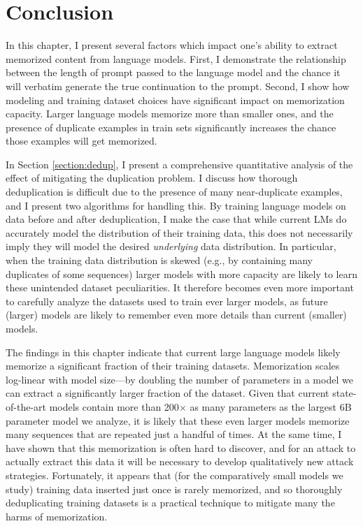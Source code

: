 \section{Conclusion}

%
In this chapter, I present several factors which impact one's ability to extract memorized content from language models.
First, I demonstrate the relationship between the length of prompt passed to the language model and the chance it will verbatim generate the true continuation to the prompt.
Second, I show how modeling and training dataset choices have significant impact on memorization capacity.
Larger language models memorize more than smaller ones, and the presence of duplicate examples in train sets significantly increases the chance those examples will get memorized.

In Section \ref{section:dedup}, I present a comprehensive quantitative analysis of the effect of mitigating the duplication problem.
I discuss how thorough deduplication is difficult due to the presence of many near-duplicate examples, and I present two algorithms for handling this.
By training language models on data before and after deduplication, I make the case that while current LMs do accurately model the distribution of their training data, this does not necessarily imply they will model the desired \emph{underlying} data distribution.
In particular, when the training data distribution is skewed (e.g., by containing many duplicates of some sequences) larger models with more capacity are likely to learn these unintended dataset peculiarities.
%
It therefore becomes even more important to carefully analyze the datasets used to train ever larger models, as future (larger) models are likely to remember even more details than current (smaller) models.


The findings in this chapter indicate that current large language models likely memorize a significant fraction of their training datasets.
%
Memorization scales log-linear with model size---by doubling the number of parameters in a model we can extract a significantly larger fraction of the dataset.
%
Given that current state-of-the-art models contain more than 200$\times$ as many parameters as the largest 6B parameter model we analyze, it is likely that these even larger models memorize many sequences that are repeated just a handful of times.
%
At the same time, I have shown that this memorization is often hard to discover, and for an attack to actually extract this data it will be necessary to develop qualitatively new attack strategies.
%
Fortunately, it appears that (for the comparatively small models we study) training data inserted just once is rarely memorized, and so thoroughly deduplicating training datasets is a practical technique to mitigate many the harms of memorization.

